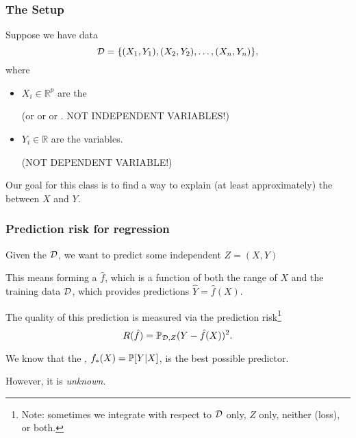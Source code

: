 \documentclass{beamer}
\begin{document}
\title{}
\subtitle{\classTitle}
\date{}



\begin{frame}
\maketitle
%
\organization
%
\end{frame}

\begin{frame}
\frametitle{The Setup}
Suppose we have data 
\[
\data = \{ (X_1 , Y_1), (X_2 , Y_2), \ldots, (X_n , Y_n) \},
\]
where 
\begin{itemize}
	\item $X_i \in \mathbb{R}^p$  are the  

	{\scriptsize (or  or  or .  NOT INDEPENDENT VARIABLES!)}
\item $Y_i \in \mathbb{R}$ are the  variables.

	{\scriptsize (NOT DEPENDENT VARIABLE!)}
\end{itemize}
\vsp

Our goal for this class is to find a way to explain (at least approximately) the 
between $X$ and $Y$.
\vsp
\end{frame}

\begin{frame}
\frametitle{Prediction risk for regression}
Given the  $\data$, we want to predict some independent  $Z = (X,Y)$

\vsp
This means forming a $\hat f$, which is a function of both the range of $X$ and the training data $\data$, 
which provides predictions $\hat Y = \hat f(X)$.

\vsp
The quality of this prediction is measured via the prediction risk\footnote{ Note: sometimes we integrate with
respect to $\data$ only, $Z$ only, neither (loss), or both.}
\[
R(\hat{f}) = \P_{\data,Z}(Y - \hat{f}(X))^2.
\]

We know that the , $f_*(X) = \P[Y | X]$, is the best possible predictor.  


\vsp
However, it is {\it unknown}.
\end{frame}
%
\end{document}
